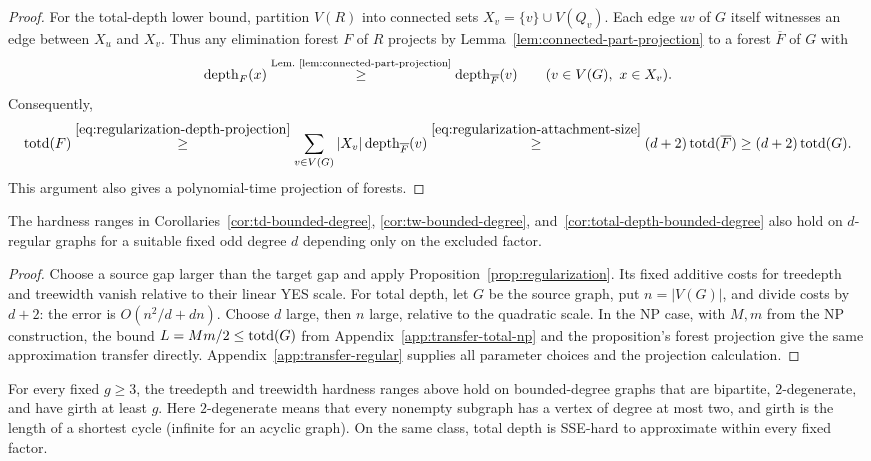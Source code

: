 \begin{proof}
For the total-depth lower bound, partition $V(R)$ into connected sets
$X_v=\{v\}\cup V(Q_v)$. Each edge $uv$ of $G$ itself witnesses
an edge between $X_u$ and $X_v$. Thus any elimination forest $F$
of $R$ projects by Lemma~\ref{lem:connected-part-projection} to a
forest $\overline F$ of $G$ with
\begin{equation}\label{eq:regularization-depth-projection}
 \operatorname{depth}_F(x)
 \overset{\text{Lem.~\ref{lem:connected-part-projection}}}{\ge}
 \operatorname{depth}_{\overline F}(v)
 \qquad(v\in V(G),\ x\in X_v).
\end{equation}
Consequently,
\[
 \operatorname{totd}(F)
 \overset{\eqref{eq:regularization-depth-projection}}{\geq}
 \sum_{v\in V(G)}|X_v|\operatorname{depth}_{\overline F}(v)
 \overset{\eqref{eq:regularization-attachment-size}}{\geq}
 (d+2)\operatorname{totd}(\overline F)\geq(d+2)\operatorname{totd}(G).
\]
This argument also gives a polynomial-time projection of forests.
\end{proof}

\begin{corollary}\label{cor:regular-hardness}
The hardness ranges in Corollaries~\ref{cor:td-bounded-degree},
\ref{cor:tw-bounded-degree}, and~\ref{cor:total-depth-bounded-degree}
also hold on $d$-regular graphs for a suitable fixed odd degree $d$
depending only on the excluded factor.
\end{corollary}

\begin{proof}
Choose a source gap larger than the target gap and apply
Proposition~\ref{prop:regularization}. Its fixed additive costs for
treedepth and treewidth vanish relative to their linear YES scale.
For total depth, let $G$ be the source graph, put $n=|V(G)|$, and
divide costs by $d+2$: the error is
$O(n^2/d+dn)$. Choose $d$ large, then $n$ large, relative to the
quadratic scale. In the NP case, with $M,m$ from the NP construction,
the bound $L=Mm/2\le\operatorname{totd}(G)$
from Appendix~\ref{app:transfer-total-np} and the proposition's
forest projection give the same approximation transfer directly.
Appendix~\ref{app:transfer-regular} supplies all parameter choices
and the projection calculation.
\end{proof}

\begin{corollary}\label{cor:subdivision-hardness}
For every fixed $g\geq3$, the treedepth and treewidth hardness ranges above
hold on bounded-degree graphs that are bipartite, $2$-degenerate, and
have girth at least $g$. Here $2$-degenerate means that every
nonempty subgraph has a vertex of degree at most two, and girth is the
length of a shortest cycle (infinite for an acyclic graph). On the same class, total depth is
SSE-hard to approximate within every fixed factor.
\end{corollary}

